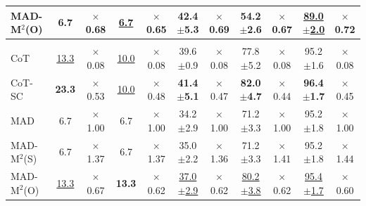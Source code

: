 \documentclass{article} %
\newcommand{\methodname}{MAD-M$^2$}
\theoremstyle{plain}
\begin{document}
\begin{table}[t]
\begin{center}
\begin{small}
\begin{threeparttable}
\begin{tabular}{lcccccccccc}
                    \rowcolor{gray!15}\methodname (O) & 6.7  & $\times$0.68 & \uline{6.7} & $\times$0.65 & 42.4$\pm$5.3 & $\times$0.69 & 54.2$\pm$2.6 & $\times$0.67 & \uline{89.0$\pm$2.0} & $\times$0.72\\
                    \midrule
                    \rowcolor{Gray}
                    \multicolumn{11}{c}{\texttt{Qwen2.5-Math-7B-Instruct}} \\
                    \midrule
                    CoT & \uline{13.3} & $\times$0.08 & \uline{10.0} & $\times$0.08 & 39.6$\pm$0.9 & $\times$0.08 & 77.8$\pm$5.2 & $\times$0.08 & 95.2$\pm$1.6 &$\times$0.08\\
                    CoT-SC & \textbf{23.3} & $\times$0.53 & \uline{10.0} & $\times$0.48  & \textbf{41.4$\pm$5.1} & $\times$0.47 & \textbf{82.0$\pm$4.7} & $\times$0.44 & \textbf{96.4$\pm$1.7}  &$\times$0.45\\
                    MAD & 6.7 &$\times$1.00  & 6.7 & $\times$1.00 & 34.2$\pm$2.9 & $\times$1.00 & 71.2$\pm$3.3 & $\times$1.00 & 95.2$\pm$1.8 &$\times$1.00\\
                    \rowcolor{gray!15}\methodname (S) & 6.7  & $\times$1.37 & 6.7 & $\times$1.37 & 35.0$\pm$2.2 & $\times$1.36 & 71.2$\pm$3.3 & $\times$1.41 & 95.2$\pm$1.8 &$\times$1.44\\
                    \rowcolor{gray!15}\methodname (O) & \uline{13.3}  & $\times$0.67 & \textbf{13.3} & $\times$0.62 & \uline{37.0$\pm$2.9} & $\times$0.62 & \uline{80.2$\pm$3.8} & $\times$0.62 & \uline{95.4$\pm$1.7}  &$\times$0.60\\

\end{tabular}
\end{threeparttable}
\end{small}
\end{center}
\end{table}
\end{document}
